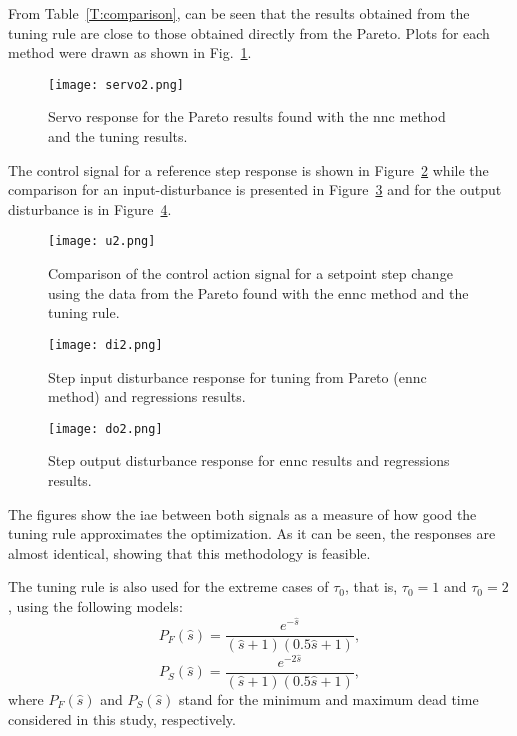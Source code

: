 From Table~\ref{T:comparison}, can be seen that the results obtained from the  tuning rule are close to those obtained directly from the Pareto. Plots for each method were drawn as shown in Fig.~\ref{F:firstsim}.
%
\begin{figure}[tb]
	\centering
	\texttt{[image: servo2.png]}
	\caption{Servo response for the Pareto results found with the \gls{nnc} method and the tuning results.}
	\label{F:firstsim}
\end{figure}
%
The control signal for a reference step response is shown in Figure~\ref{F:u1} while the comparison for an input-disturbance is presented in Figure~\ref{F:di1} and for the output disturbance is in Figure~\ref{F:do1}. 
%
\begin{figure}[tb]
	\centering
	\texttt{[image: u2.png]}
	\caption{Comparison of the control action  signal for a setpoint step change using the data from the Pareto found with the \gls{ennc} method and the tuning rule.}
	\label{F:u1}
\end{figure}
%
\begin{figure}[tb]
	\centering
	\texttt{[image: di2.png]}
	\caption{Step input disturbance response for tuning from Pareto (\gls{ennc} method) and regressions results.}
	\label{F:di1}
\end{figure}
%
\begin{figure}[tb]
	\centering
	\texttt{[image: do2.png]}
	\caption{Step output disturbance response for \gls{ennc} results and regressions results.}
	\label{F:do1}
\end{figure}
%
The figures show the \gls{iae} between both signals as a measure of how good the tuning rule approximates the optimization. As it can be seen, the responses are almost identical, showing that this methodology is feasible.

The tuning rule is also used for the extreme cases of $\tau_0$, that is, $\tau_0=1$ and $\tau_0=2$, using the following models:
%
\begin{equation}
P_F(\hat{s}) = \frac{e^{-\hat{s}}}{(\hat{s}+1)(0.5\hat{s}+1)},
\label{E:p2}
\end{equation}
%
\begin{equation}
P_S(\hat{s}) = \frac{e^{-2\hat{s}}}{(\hat{s}+1)(0.5\hat{s}+1)},
\label{E:p3}
\end{equation}
%
where $P_F(\hat{s})$ and $P_S(\hat{s})$ stand for the minimum and maximum  dead time considered in this study, respectively.


